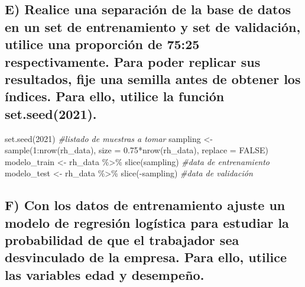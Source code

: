 \documentclass[
]{article}
\newenvironment{Shaded}{\begin{snugshade}}{\end{snugshade}}
\newcommand{\AttributeTok}[1]{\textcolor[rgb]{0.77,0.63,0.00}{#1}}
\newcommand{\CommentTok}[1]{\textcolor[rgb]{0.56,0.35,0.01}{\textit{#1}}}
\newcommand{\ConstantTok}[1]{\textcolor[rgb]{0.00,0.00,0.00}{#1}}
\newcommand{\DecValTok}[1]{\textcolor[rgb]{0.00,0.00,0.81}{#1}}
\newcommand{\FloatTok}[1]{\textcolor[rgb]{0.00,0.00,0.81}{#1}}
\newcommand{\FunctionTok}[1]{\textcolor[rgb]{0.00,0.00,0.00}{#1}}
\newcommand{\NormalTok}[1]{#1}
\newcommand{\OtherTok}[1]{\textcolor[rgb]{0.56,0.35,0.01}{#1}}
\newcommand{\SpecialCharTok}[1]{\textcolor[rgb]{0.00,0.00,0.00}{#1}}
\begin{document}
\hypertarget{e-realice-una-separaciuxf3n-de-la-base-de-datos-en-un-set-de-entrenamiento-y-set-de-validaciuxf3n-utilice-una-proporciuxf3n-de-7525-respectivamente.-para-poder-replicar-sus-resultados-fije-una-semilla-antes-de-obtener-los-uxedndices.-para-ello-utilice-la-funciuxf3n-set.seed2021.}{%
\subsection{E) Realice una separación de la base de datos en un set de
entrenamiento y set de validación, utilice una proporción de 75:25
respectivamente. Para poder replicar sus resultados, fije una semilla
antes de obtener los índices. Para ello, utilice la función
set.seed(2021).}\label{e-realice-una-separaciuxf3n-de-la-base-de-datos-en-un-set-de-entrenamiento-y-set-de-validaciuxf3n-utilice-una-proporciuxf3n-de-7525-respectivamente.-para-poder-replicar-sus-resultados-fije-una-semilla-antes-de-obtener-los-uxedndices.-para-ello-utilice-la-funciuxf3n-set.seed2021.}}

\begin{Shaded}
\begin{Highlighting}[]
\FunctionTok{set.seed}\NormalTok{(}\DecValTok{2021}\NormalTok{)}
\CommentTok{\#listado de muestras a tomar}
\NormalTok{sampling }\OtherTok{\textless{}{-}} \FunctionTok{sample}\NormalTok{(}\DecValTok{1}\SpecialCharTok{:}\FunctionTok{nrow}\NormalTok{(rh\_data), }\AttributeTok{size =} \FloatTok{0.75}\SpecialCharTok{*}\FunctionTok{nrow}\NormalTok{(rh\_data), }\AttributeTok{replace =} \ConstantTok{FALSE}\NormalTok{) }
\NormalTok{modelo\_train }\OtherTok{\textless{}{-}}\NormalTok{ rh\_data }\SpecialCharTok{\%\textgreater{}\%} \FunctionTok{slice}\NormalTok{(sampling) }\CommentTok{\#data de entrenamiento}
\NormalTok{modelo\_test }\OtherTok{\textless{}{-}}\NormalTok{ rh\_data }\SpecialCharTok{\%\textgreater{}\%} \FunctionTok{slice}\NormalTok{(}\SpecialCharTok{{-}}\NormalTok{sampling) }\CommentTok{\#data de validación}
\end{Highlighting}
\end{Shaded}

\hypertarget{f-con-los-datos-de-entrenamiento-ajuste-un-modelo-de-regresiuxf3n-loguxedstica-para-estudiar-la-probabilidad-de-que-el-trabajador-sea-desvinculado-de-la-empresa.-para-ello-utilice-las-variables-edad-y-desempeuxf1o.}{%
\subsection{F) Con los datos de entrenamiento ajuste un modelo de
regresión logística para estudiar la probabilidad de que el trabajador
sea desvinculado de la empresa. Para ello, utilice las variables edad y
desempeño.}\label{f-con-los-datos-de-entrenamiento-ajuste-un-modelo-de-regresiuxf3n-loguxedstica-para-estudiar-la-probabilidad-de-que-el-trabajador-sea-desvinculado-de-la-empresa.-para-ello-utilice-las-variables-edad-y-desempeuxf1o.}}
\end{document}
